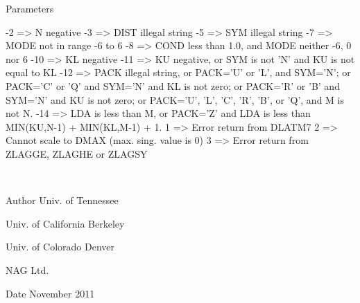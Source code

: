 \begin{DoxyParams}[1]{Parameters}
\begin{DoxyVerb}
            -2 => N negative
            -3 => DIST illegal string
            -5 => SYM illegal string
            -7 => MODE not in range -6 to 6
            -8 => COND less than 1.0, and MODE neither -6, 0 nor 6
           -10 => KL negative
           -11 => KU negative, or SYM is not 'N' and KU is not equal to
                  KL
           -12 => PACK illegal string, or PACK='U' or 'L', and SYM='N';
                  or PACK='C' or 'Q' and SYM='N' and KL is not zero;
                  or PACK='R' or 'B' and SYM='N' and KU is not zero;
                  or PACK='U', 'L', 'C', 'R', 'B', or 'Q', and M is not
                  N.
           -14 => LDA is less than M, or PACK='Z' and LDA is less than
                  MIN(KU,N-1) + MIN(KL,M-1) + 1.
            1  => Error return from DLATM7
            2  => Cannot scale to DMAX (max. sing. value is 0)
            3  => Error return from ZLAGGE, ZLAGHE or ZLAGSY\end{DoxyVerb}
 \\
\hline
\end{DoxyParams}
\begin{DoxyAuthor}{Author}
Univ. of Tennessee 

Univ. of California Berkeley 

Univ. of Colorado Denver 

N\+A\+G Ltd. 
\end{DoxyAuthor}
\begin{DoxyDate}{Date}
November 2011 
\end{DoxyDate}

